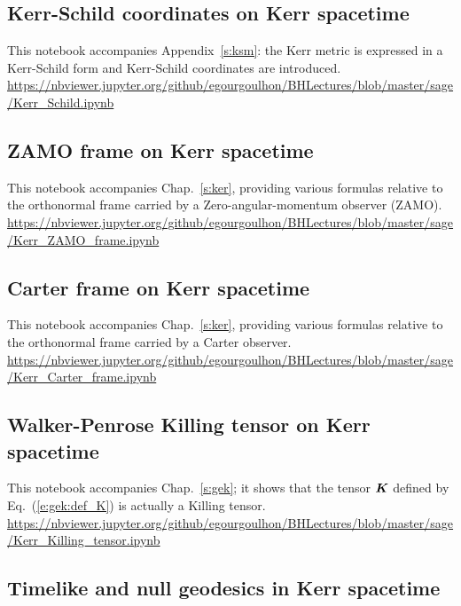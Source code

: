 \subsection{Kerr-Schild coordinates on Kerr spacetime} \label{s:sam:Kerr_Schild}

This notebook accompanies Appendix~\ref{s:ksm}: the Kerr metric is expressed in
a Kerr-Schild form and Kerr-Schild coordinates are introduced.\\[1ex]
{\footnotesize
\url{https://nbviewer.jupyter.org/github/egourgoulhon/BHLectures/blob/master/sage/Kerr_Schild.ipynb}
}

\subsection{ZAMO frame on Kerr spacetime} \label{s:sam:Kerr_ZAMO_frame}

This notebook accompanies Chap.~\ref{s:ker}, providing various formulas relative to
the orthonormal frame carried by a Zero-angular-momentum observer (ZAMO).\\[1ex]
{\footnotesize
\url{https://nbviewer.jupyter.org/github/egourgoulhon/BHLectures/blob/master/sage/Kerr_ZAMO_frame.ipynb}
}

\subsection{Carter frame on Kerr spacetime} \label{s:sam:Kerr_Carter_frame}

This notebook accompanies Chap.~\ref{s:ker}, providing various formulas relative to
the orthonormal frame carried by a Carter observer.\\[1ex]
{\footnotesize
\url{https://nbviewer.jupyter.org/github/egourgoulhon/BHLectures/blob/master/sage/Kerr_Carter_frame.ipynb}
}


\subsection{Walker-Penrose Killing tensor on Kerr spacetime} \label{s:sam:Kerr_Killing_tensor}

This notebook accompanies Chap.~\ref{s:gek}; it shows that the
tensor $\bm{K}$ defined by Eq.~(\ref{e:gek:def_K}) is actually a Killing tensor.\\[1ex]
{\footnotesize
\url{https://nbviewer.jupyter.org/github/egourgoulhon/BHLectures/blob/master/sage/Kerr_Killing_tensor.ipynb}
}


\subsection{Timelike and null geodesics in Kerr spacetime} \label{s:sam:Kerr_geod_plots}

